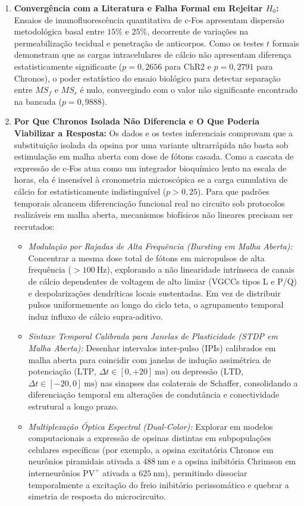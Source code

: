 \documentclass[11pt,a4paper,article,brazil]{abntex2}
\begin{document}
\begin{enumerate}
    \item \textbf{Convergência com a Literatura e Falha Formal em Rejeitar $H_0$:} Ensaios de imunofluorescência quantitativa de c-Fos apresentam dispersão metodológica basal entre $15\%$ e $25\%$, decorrente de variações na permeabilização tecidual e penetração de anticorpos. Como os testes $t$ formais demonstram que as cargas intracelulares de cálcio não apresentam diferença estatisticamente significante ($p = 0{,}2656$ para ChR2 e $p = 0{,}2791$ para Chronos), o poder estatístico do ensaio biológico para detectar separação entre $MS_f$ e $MS_r$ é nulo, convergindo com o valor não significante encontrado na bancada ($p = 0{,}9888$).
    \item \textbf{Por Que Chronos Isolada Não Diferencia e O Que Poderia Viabilizar a Resposta:} Os dados e os testes inferenciais comprovam que a substituição isolada da opsina por uma variante ultrarrápida não basta sob estimulação em malha aberta com dose de fótons casada. Como a cascata de expressão de c-Fos atua como um integrador bioquímico lento na escala de horas, ela é insensível à cronometria microscópica se a carga cumulativa de cálcio for estatisticamente indistinguível ($p > 0{,}25$). Para que padrões temporais alcancem diferenciação funcional real no circuito sob protocolos realizáveis em malha aberta, mecanismos biofísicos não lineares precisam ser recrutados:
          \begin{itemize}
              \item \emph{Modulação por Rajadas de Alta Frequência (Bursting em Malha Aberta):} Concentrar a mesma dose total de fótons em micropulsos de alta frequência ($> \qty{100}{\hertz}$), explorando a não linearidade intrínseca de canais de cálcio dependentes de voltagem de alto limiar (VGCCs tipos L e P/Q) e despolarizações dendríticas locais sustentadas. Em vez de distribuir pulsos uniformemente ao longo do ciclo teta, o agrupamento temporal induz influxo de cálcio supra-aditivo.
              \item \emph{Sintaxe Temporal Calibrada para Janelas de Plasticidade (STDP em Malha Aberta):} Desenhar intervalos inter-pulso (IPIs) calibrados em malha aberta para coincidir com janelas de indução assimétrica de potenciação ($\text{LTP}$, $\Delta t \in [0, +20]\ \unit{\milli\second}$) ou depressão ($\text{LTD}$, $\Delta t \in [-20, 0]\ \unit{\milli\second}$) nas sinapses das colaterais de Schaffer, consolidando a diferenciação temporal em alterações de condutância e conectividade estrutural a longo prazo.
              \item \emph{Multiplexação Óptica Espectral (Dual-Color):} Explorar em modelos computacionais a expressão de opsinas distintas em subpopulações celulares específicas (por exemplo, a opsina excitatória Chronos em neurônios piramidais ativada a $\qty{488}{\nano\meter}$ e a opsina inibitória Chrimson em interneurônios $\text{PV}^+$ ativada a $\qty{625}{\nano\meter}$), permitindo dissociar temporalmente a excitação do freio inibitório perissomático e quebrar a simetria de resposta do microcircuito.
          \end{itemize}
\end{enumerate}
\end{document}

